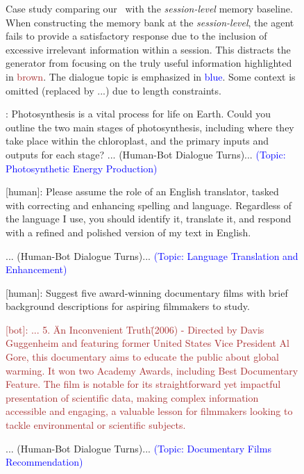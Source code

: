 \begin{figure}[htbp]
\begin{tcolorbox}[left=3pt,right=3pt,top=3pt,bottom=3pt,title=\textbf{Answer (Ours):}]
\end{tcolorbox}
\caption{Case study comparing our \sysname\ with the \textit{session-level} memory baseline. When constructing the memory bank at the \textit{session-level}, the agent fails to provide a satisfactory response due to the inclusion of excessive irrelevant information within a session. This distracts the generator from focusing on the truly useful information highlighted in \textcolor{brown}{brown}. The dialogue topic is emphasized in \textcolor{blue}{blue}. Some context is omitted (replaced by ...) due to length constraints.}
\label{fig: case_study_segment_vs_session}
\end{figure}



\begin{figure}[htb]
\small
\begin{tcolorbox}[left=3pt,right=3pt,top=3pt,bottom=3pt,title=\textbf{Conversation History:}]
[human]: Photosynthesis is a vital process for life on Earth. Could you outline the two main stages of photosynthesis, including where they take place within the chloroplast, and the primary inputs and outputs for each stage? ... (Human-Bot Dialogue Turns)... \textcolor{blue}{(Topic: Photosynthetic Energy Production)}

[human]: Please assume the role of an English translator, tasked with correcting and enhancing spelling and language. Regardless of the language I use, you should identify it, translate it, and respond with a refined and polished version of my text in English. 

... (Human-Bot Dialogue Turns)...  \textcolor{blue}{(Topic: Language Translation and Enhancement)}

[human]: Suggest five award-winning documentary films with brief background descriptions for aspiring filmmakers to study.

\textcolor{brown}{[bot]: ...
5. \"An Inconvenient Truth\" (2006) - Directed by Davis Guggenheim and featuring former United States Vice President Al Gore, this documentary aims to educate the public about global warming. It won two Academy Awards, including Best Documentary Feature. The film is notable for its straightforward yet impactful presentation of scientific data, making complex information accessible and engaging, a valuable lesson for filmmakers looking to tackle environmental or scientific subjects.}

... (Human-Bot Dialogue Turns)... 
\textcolor{blue}{(Topic: Documentary Films Recommendation)}


\end{tcolorbox}
\end{figure}
